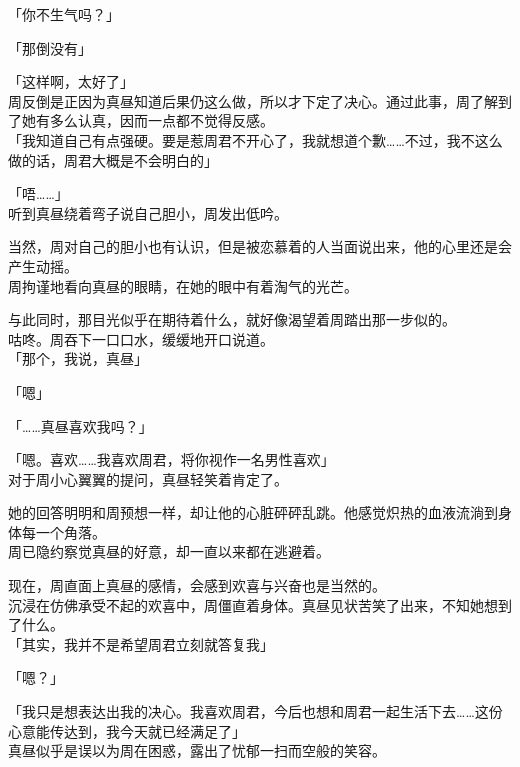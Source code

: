 「你不生气吗？」

「那倒没有」

「这样啊，太好了」\\

周反倒是正因为真昼知道后果仍这么做，所以才下定了决心。通过此事，周了解到了她有多么认真，因而一点都不觉得反感。\\

「我知道自己有点强硬。要是惹周君不开心了，我就想道个歉……不过，我不这么做的话，周君大概是不会明白的」

「唔……」\\

听到真昼绕着弯子说自己胆小，周发出低吟。

当然，周对自己的胆小也有认识，但是被恋慕着的人当面说出来，他的心里还是会产生动摇。\\

周拘谨地看向真昼的眼睛，在她的眼中有着淘气的光芒。

与此同时，那目光似乎在期待着什么，就好像渴望着周踏出那一步似的。\\

咕咚。周吞下一口口水，缓缓地开口说道。\\

「那个，我说，真昼」

「嗯」

「……真昼喜欢我吗？」

「嗯。喜欢……我喜欢周君，将你视作一名男性喜欢」\\

对于周小心翼翼的提问，真昼轻笑着肯定了。

她的回答明明和周预想一样，却让他的心脏砰砰乱跳。他感觉炽热的血液流淌到身体每一个角落。\\

周已隐约察觉真昼的好意，却一直以来都在逃避着。

现在，周直面上真昼的感情，会感到欢喜与兴奋也是当然的。\\

沉浸在仿佛承受不起的欢喜中，周僵直着身体。真昼见状苦笑了出来，不知她想到了什么。\\

「其实，我并不是希望周君立刻就答复我」

「嗯？」

「我只是想表达出我的决心。我喜欢周君，今后也想和周君一起生活下去……这份心意能传达到，我今天就已经满足了」\\

真昼似乎是误以为周在困惑，露出了忧郁一扫而空般的笑容。\\

